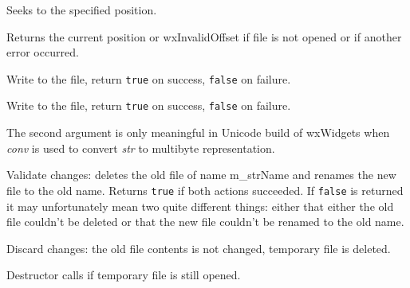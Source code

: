 Seeks to the specified position.

\label{wxtempfiletell}


Returns the current position or wxInvalidOffset if file is not opened or if another
error occurred.

\label{wxtempfilewrite}


Write to the file, return {\tt true} on success, {\tt false} on failure.

\label{wxtempfilewrites}


Write to the file, return {\tt true} on success, {\tt false} on failure.

The second argument is only meaningful in Unicode build of wxWidgets when
{\it conv} is used to convert {\it str} to multibyte representation.

\label{wxtempfilecommit}


Validate changes: deletes the old file of name m\_strName and renames the new
file to the old name. Returns {\tt true} if both actions succeeded. If {\tt false} is
returned it may unfortunately mean two quite different things: either that
either the old file couldn't be deleted or that the new file couldn't be renamed
to the old name.

\label{wxtempfilediscard}


Discard changes: the old file contents is not changed, temporary file is
deleted.

\label{wxtempfiledtor}


Destructor calls  if temporary file
is still opened.

